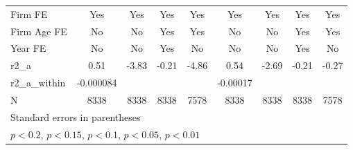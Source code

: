 {\begin{tabular}{l*{8}{c}}
\addlinespace
Firm FE             &         Yes         &         Yes         &         Yes         &         Yes         &         Yes         &         Yes         &         Yes         &         Yes         \\
\addlinespace
Firm Age FE         &          No         &          No         &         Yes         &         Yes         &          No         &          No         &         Yes         &         Yes         \\
\addlinespace
Year FE             &          No         &          No         &         Yes         &          No         &          No         &          No         &         Yes         &          No         \\
\midrule
r2\_a                &        0.51         &       -3.83         &       -0.21         &       -4.86         &        0.54         &       -2.69         &       -0.21         &       -0.27         \\
r2\_a\_within         &   -0.000084         &                     &                     &                     &    -0.00017         &                     &                     &                     \\
N                   &        8338         &        8338         &        8338         &        7578         &        8338         &        8338         &        8338         &        7578         \\
\bottomrule
\multicolumn{9}{l}{\footnotesize Standard errors in parentheses}\\
\multicolumn{9}{l}{\footnotesize \sym{++} \(p<0.2\), \sym{+} \(p<0.15\), \sym{*} \(p<0.1\), \sym{**} \(p<0.05\), \sym{***} \(p<0.01\)}\\
\end{tabular}
}
